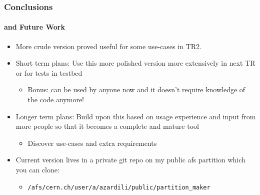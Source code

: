 \documentclass{beamer}
\begin{document}
\begin{frame}
  \frametitle{Conclusions}
  \framesubtitle{and Future Work}
  \begin{itemize}
    \item More crude version proved useful for some use-cases in TR2.

    \item Short term plans: Use this more polished version more extensively
      in next TR or for tests in testbed
      \begin{itemize}
        \item Bonus: can be used by anyone now and it doesn't require knowledge of the
          code anymore!
      \end{itemize}

    \item Longer term plans: Build upon this based on usage experience and input from
      more people so that it becomes a complete and mature tool
      \begin{itemize}

        \item Discover use-cases and extra requirements
       \end{itemize}

    \item Current version lives in a private git repo on my public afs
      partition which you can clone:
      \begin{itemize}
        \item \texttt{/afs/cern.ch/user/a/azardili/public/partition\_maker}
      \end{itemize}
  \end{itemize}
\end{frame}
\end{document}
